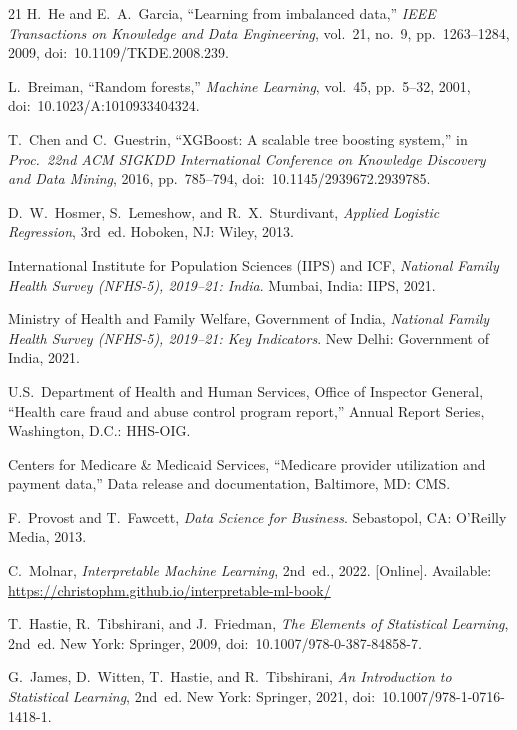 \begin{thebibliography}{21}
H.~He and E.~A.~Garcia,
``Learning from imbalanced data,''
\textit{IEEE Transactions on Knowledge and Data Engineering}, vol.~21, no.~9, pp.~1263--1284, 2009,
doi:~10.1109/TKDE.2008.239.

L.~Breiman,
``Random forests,''
\textit{Machine Learning}, vol.~45, pp.~5--32, 2001,
doi:~10.1023/A:1010933404324.

T.~Chen and C.~Guestrin,
``XGBoost: A scalable tree boosting system,''
in \textit{Proc.\ 22nd ACM SIGKDD International Conference on Knowledge Discovery and Data Mining}, 2016, pp.~785--794,
doi:~10.1145/2939672.2939785.

D.~W.~Hosmer, S.~Lemeshow, and R.~X.~Sturdivant,
\textit{Applied Logistic Regression}, 3rd~ed.
Hoboken, NJ: Wiley, 2013.

International Institute for Population Sciences (IIPS) and ICF,
\textit{National Family Health Survey (NFHS-5), 2019--21: India}.
Mumbai, India: IIPS, 2021.

Ministry of Health and Family Welfare, Government of India,
\textit{National Family Health Survey (NFHS-5), 2019--21: Key Indicators}.
New Delhi: Government of India, 2021.

U.S.~Department of Health and Human Services, Office of Inspector General,
``Health care fraud and abuse control program report,''
Annual Report Series, Washington, D.C.: HHS-OIG.

Centers for Medicare \& Medicaid Services,
``Medicare provider utilization and payment data,''
Data release and documentation, Baltimore, MD: CMS.

F.~Provost and T.~Fawcett,
\textit{Data Science for Business}.
Sebastopol, CA: O'Reilly Media, 2013.

C.~Molnar,
\textit{Interpretable Machine Learning}, 2nd~ed., 2022.
[Online]. Available: \url{https://christophm.github.io/interpretable-ml-book/}

T.~Hastie, R.~Tibshirani, and J.~Friedman,
\textit{The Elements of Statistical Learning}, 2nd~ed.
New York: Springer, 2009,
doi:~10.1007/978-0-387-84858-7.

G.~James, D.~Witten, T.~Hastie, and R.~Tibshirani,
\textit{An Introduction to Statistical Learning}, 2nd~ed.
New York: Springer, 2021,
doi:~10.1007/978-1-0716-1418-1.

\end{thebibliography}
